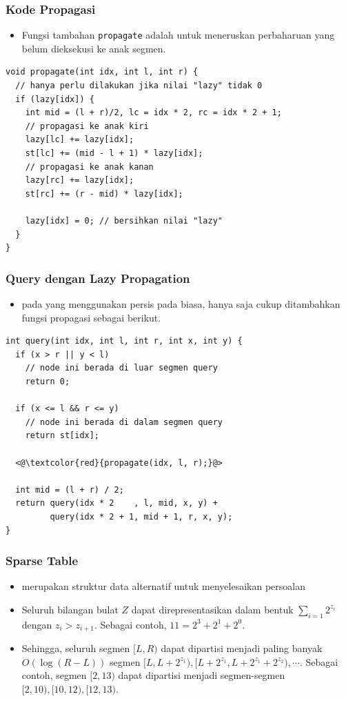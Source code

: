 \begin{frame}[fragile]
\frametitle{Kode Propagasi}
\begin{itemize}
  \item Fungsi tambahan \lstinline{propagate} adalah untuk meneruskan perbaharuan yang belum dieksekusi ke anak segmen.
\end{itemize}
\begin{lstlisting}
void propagate(int idx, int l, int r) {
  // hanya perlu dilakukan jika nilai "lazy" tidak 0
  if (lazy[idx]) { 
    int mid = (l + r)/2, lc = idx * 2, rc = idx * 2 + 1;
    // propagasi ke anak kiri
    lazy[lc] += lazy[idx];
    st[lc] += (mid - l + 1) * lazy[idx]; 
    // propagasi ke anak kanan
    lazy[rc] += lazy[idx];
    st[rc] += (r - mid) * lazy[idx];

    lazy[idx] = 0; // bersihkan nilai "lazy"
  }
}
\end{lstlisting}
\end{frame}

\begin{frame}[fragile]
\frametitle{Query dengan Lazy Propagation}
\begin{itemize}
  \item \fQuery pada \fsegmentTree yang menggunakan \flazyPropagation persis pada \fquery biasa, hanya saja cukup ditambahkan fungsi propagasi sebagai berikut.
\end{itemize}
\begin{lstlisting}
int query(int idx, int l, int r, int x, int y) {
  if (x > r || y < l)
    // node ini berada di luar segmen query
    return 0;

  if (x <= l && r <= y)
    // node ini berada di dalam segmen query
    return st[idx];

  <@\textcolor{red}{propagate(idx, l, r);}@>
  
  int mid = (l + r) / 2;
  return query(idx * 2    , l, mid, x, y) + 
         query(idx * 2 + 1, mid + 1, r, x, y);
}
\end{lstlisting}
\end{frame}

\begin{frame}
\frametitle{Sparse Table}
\begin{itemize}
  \item {} merupakan struktur data alternatif untuk menyelesaikan persoalan \frangeSumQuery
  \item Seluruh bilangan bulat $Z$ dapat direpresentasikan dalam bentuk $\sum_{i=1} 2^{z_i}$ dengan $z_{i} > z_{i + 1}$. Sebagai contoh, $11 = 2^3 + 2^1 + 2^0$.
  \item Sehingga, seluruh segmen $[L, R)$ dapat dipartisi menjadi paling banyak $O(\log (R - L))$ segmen $[L, L + 2^{z_1}), [L + 2^{z_1}, L + 2^{z_1} + 2^{z_2}), \cdots$. Sebagai contoh, segmen $[2, 13)$ dapat dipartisi menjadi segmen-segmen $[2, 10), [10, 12), [12, 13)$.
\end{itemize}
\end{frame}

